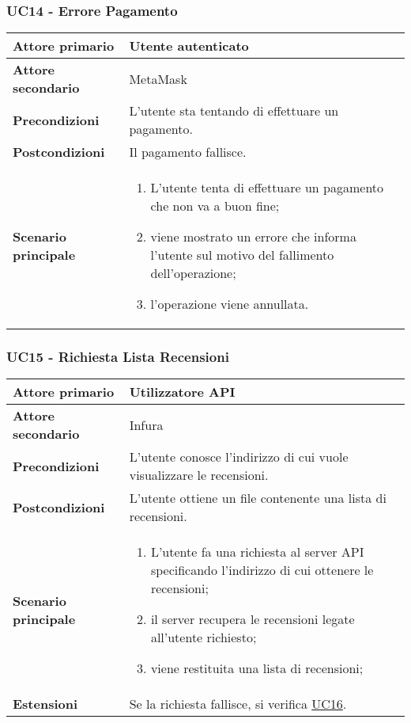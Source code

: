 \subsubsection{UC14 - Errore Pagamento}
\label{UC14}
\begin{center}
\renewcommand{\arraystretch}{1.5}
\begin{tabular}{ | m{10em} | m{20em} | }
    \hline
    \textbf{Attore primario} & Utente autenticato \\
    \hline
    \textbf{Attore secondario} & MetaMask \\
    \hline
    \textbf{Precondizioni} & L'utente sta tentando di effettuare un pagamento. \\
    \hline
    \textbf{Postcondizioni} & Il pagamento fallisce. \\
    \hline
    \textbf{Scenario principale} & \begin{enumerate}
        \item L'utente tenta di effettuare un pagamento che non va a buon fine;
        \item viene mostrato un errore che informa l'utente sul motivo del fallimento
              dell'operazione;
        \item l'operazione viene annullata.
    \end{enumerate} \\
    \hline
   \end{tabular}
\end{center}

\subsubsection{UC15 - Richiesta Lista Recensioni}
\label{UC15}
\begin{center}
\renewcommand{\arraystretch}{1.5}
\begin{tabular}{ | m{10em} | m{20em} | }
    \hline
    \textbf{Attore primario} & Utilizzatore API \\
    \hline
    \textbf{Attore secondario} & Infura \\
    \hline
    \textbf{Precondizioni} & L'utente conosce l'indirizzo di cui vuole visualizzare le recensioni. \\
    \hline
    \textbf{Postcondizioni} & L'utente ottiene un file contenente una lista di recensioni. \\
    \hline
    \textbf{Scenario principale} & \begin{enumerate}
        \item L'utente fa una richiesta al server API specificando l'indirizzo di cui
              ottenere le recensioni;
        \item il server recupera le recensioni legate all'utente richiesto;
        \item viene restituita una lista di recensioni;
    \end{enumerate} \\
    \hline
    \textbf{Estensioni} & Se la richiesta fallisce, si verifica \hyperref[UC16]{UC16}. \\
    \hline
   \end{tabular}
\end{center}

